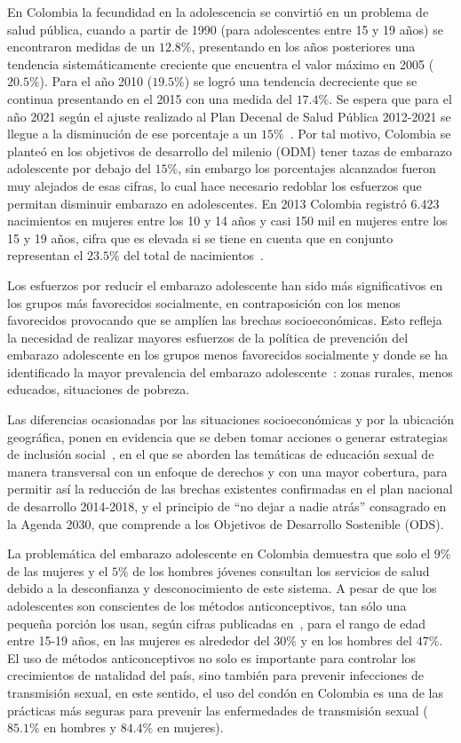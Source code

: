 \documentclass[journal,transmag]{IEEEtran}
\begin{document}
En Colombia la fecundidad en la adolescencia se convirtió en un problema de salud pública, cuando a partir de 1990 (para adolescentes entre 15 y 19 años) se encontraron medidas de un $12.8\%$, presentando  en los años posteriores una tendencia sistemáticamente creciente que encuentra el valor máximo en 2005 ($20.5\%$). Para el año 2010 ($19.5\%$) se logró una tendencia decreciente que se continua presentando en el 2015 con una medida del $17.4\%$. Se espera que para el año 2021 según el ajuste realizado al Plan Decenal de Salud Pública 2012-2021 se llegue a la disminución de ese porcentaje a un $15\%$~\cite{Pro2015}. Por tal motivo, Colombia se planteó en los objetivos de desarrollo del milenio (ODM) tener tazas de embarazo adolescente por debajo del $15\%$, sin embargo los porcentajes alcanzados fueron muy alejados de esas cifras, lo cual hace necesario redoblar los esfuerzos que permitan disminuir embarazo en adolescentes. En 2013 Colombia registró 6.423 nacimientos en mujeres entre los 10 y 14 años y casi 150 mil en mujeres entre los 15 y 19 años, cifra que es elevada si se tiene en cuenta que en conjunto representan el $23.5\%$ del total de nacimientos~\cite{PNUD2015}.

Los esfuerzos por reducir el embarazo adolescente han sido más significativos en los grupos más favorecidos socialmente, en contraposición con los menos favorecidos provocando que se amplíen las brechas socioeconómicas. Esto refleja la  necesidad de realizar mayores esfuerzos de la política de prevención del embarazo adolescente en los grupos menos favorecidos socialmente y donde se ha identificado la mayor prevalencia del embarazo adolescente~\cite{Pro2015, Pro2015II}: zonas rurales, menos educados, situaciones de pobreza. 

Las diferencias ocasionadas por las situaciones socioeconómicas y por la ubicación geográfica, ponen en evidencia que se deben tomar acciones o generar estrategias de inclusión social~\cite{BID2017}, en el que se aborden las temáticas de educación sexual de manera transversal con un enfoque de derechos y con una mayor cobertura, para permitir así la reducción de las brechas existentes confirmadas en el plan nacional de desarrollo 2014-2018, y  el  principio  de  “no  dejar  a  nadie  atrás”  consagrado  en  la  Agenda  2030,  que  comprende a los Objetivos de Desarrollo Sostenible (ODS).

La problemática del embarazo adolescente en Colombia demuestra que solo el $9\%$ de las mujeres y el $5\%$ de los hombres jóvenes consultan los servicios de salud debido a la desconfianza y desconocimiento de este sistema. A pesar de que los adolescentes son conscientes de los métodos anticonceptivos, tan sólo una pequeña porción los usan, según cifras publicadas en~\cite{Pro2015II}, para el rango de edad entre 15-19 años, en las mujeres es alrededor del $30\%$ y en los hombres del $47\%$. El uso de métodos anticonceptivos no solo es importante para controlar los crecimientos de natalidad del país, sino también para prevenir infecciones de transmisión sexual, en este sentido, el uso del condón en Colombia es una de las prácticas más seguras para prevenir las enfermedades de transmisión sexual ($85.1\%$ en hombres y $84.4\%$ en mujeres).
\end{document}
